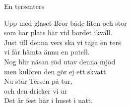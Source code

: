 \begin{song}{En ters}{enters}
\begin{vers}
Upp med glaset Bror både liten och stor\\
som har plats här vid bordet ikväll.\\
Just till denna vers ska vi taga en ters\\
vi får hämta ännu en putell.\\
Nog blir näsan röd utav denna mjöd\\
men kulören den gör ej ett skvatt.\\
Nu står Tersen på tur,\\
och den dricker vi ur\\
Det är fest här i huset i natt.\\
\end{vers}
\end{song}
